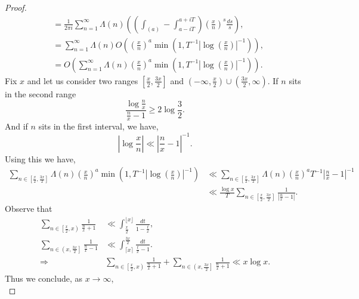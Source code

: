 \documentclass{article}
\begin{document}
\begin{proof}
\begin{align*}
      & = {\frac 1 {2\pi i}}\sum_{n=1}^\infty \Lambda(n)\left(\left(\int_{(a)}-\int_{a-iT}^{a+iT}\right)\left({\frac x n}\right)^s{\frac {ds} s}\right),\\
      & = \sum_{n=1}^\infty\Lambda(n)O\left(\left({\frac x n}\right)^a\min\left(1,T^{-1}\left\vert\log\left({\frac x n}\right)\right\vert^{-1}\right)\right),\\
      & = O\left(\sum_{n=1}^\infty\Lambda(n)\left({\frac x n}\right)^a\min\left(1,T^{-1}\left\vert\log\left({\frac x n}\right)\right\vert^{-1}\right)\right).
    \end{align*}
    Fix $x$ and let us consider two ranges $\left[{\frac x 2},{\frac {3x} 2}\right]$ and $\left(-\infty,{\frac x 2}\right)\cup\left({\frac {3x} 2},\infty\right)$. 
    If $n$ sits in the second range 
    \begin{equation*}
      {\frac {\log{\frac n x}} {{\frac n x}-1}}\geq 2\log{\frac 3 2}.
    \end{equation*}
    And if $n$ sits in the first interval, we have, 
    \begin{equation*}
      \left\vert\log{\frac x n}\right\vert \ll \left\vert{\frac n x}-1\right\vert^{-1}.
    \end{equation*}
    Using this we have,
    \begin{align*}
      \sum_{n\in\left[{\frac x 2},{\frac {3x} 2}\right]}\Lambda(n)\left({\frac x n}\right)^a\min\left(1,T^{-1}\left\vert\log\left({\frac x n}\right)\right\vert^{-1}\right)&\ll \sum_{n\in\left[{\frac x 2},{\frac {3x} 2}\right]}\Lambda(n)\left({\frac x n}\right)^a T^{-1}\left\vert{\frac n x}-1\right\vert^{-1}\\
      &\ll {\frac {\log x} T}\sum_{n\in\left[{\frac x 2},{\frac {3x} 2}\right]}{\frac 1 {\left\vert {\frac n x}-1\right\vert}}.
    \end{align*}
    Observe that 
    \begin{align*}
      \sum_{n\in\left[{\frac x 2},x\right)}{\frac 1 {{\frac n x}+1}}&\ll \int_{{\frac x 2}}^{\lfloor x\rfloor}{\frac {dt} {1-{\frac t x}}},\\
      \sum_{n\in\left(x,{\frac {3x} 2}\right]}{\frac 1 {{\frac n x}-1}}&\ll \int^{{\frac {3x} 2}}_{\lceil x\rceil}{\frac {dt} {{\frac t x}-1}}.\\
      \Rightarrow &  \sum_{n\in\left[{\frac x 2},x\right)}{\frac 1 {{\frac n x}+1}}+\sum_{n\in\left(x,{\frac {3x} 2}\right]}{\frac 1 {{\frac n x}+1}}\ll x\log x.
    \end{align*}
    Thus we conclude, as $x\to \infty$,
    \begin{equation*}

\end{equation*}
\end{proof}
\end{document}
